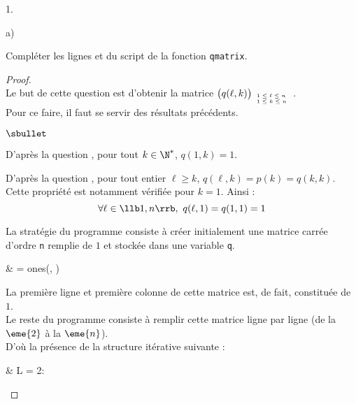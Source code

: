 \begin{noliste}{1.}
  \newpage


  \begin{noliste}{a)}
    \setlength{\itemsep}{2mm}
  \item Compléter les lignes  et  du script de la
    fonction {\tt qmatrix}.

    \begin{proof}~\\%
      Le but de cette question est d'obtenir la matrice $\big(q(\ell,
      k) \big)_{\tiny
        \begin{array}{l}
          1 \leq \ell \leq n \\
          1 \leq k \leq n 
        \end{array}
      }$.\\
      Pour ce faire, il faut se servir des résultats précédents.
      \begin{noliste}{$\sbullet$}
      \item D'après la question , pour tout $k \in
        \N^*$, $q(1, k) = 1$.%

      \item D'après la question , pour tout entier
        $\ell \geq k$, $q(\ell, k) = p(k) = q(k, k)$. Cette propriété
        est notamment vérifiée pour $k = 1$. Ainsi :
        \[
        \forall \ell \in \llb 1, n \rrb, \ q(\ell, 1) = q(1, 1) = 1
        \]

      \item La stratégie du programme consiste à créer initialement
        une matrice carrée d'ordre {\tt n} remplie de $1$ et stockée
        dans une variable {\tt q}.
        \begin{scilabC}{1}
          & \qquad {} = ones(, ) \nl %
        \end{scilabC}
        La première ligne et première colonne de cette matrice est, de
        fait, constituée de $1$.\\
        Le reste du programme consiste à remplir cette matrice ligne
        par ligne (de la $\eme{2}$ à la $\eme{n}$).\\
        D'où la présence de la structure itérative suivante :
        \begin{scilabC}{2}
          & \qquad {} L = 2: \nl %
        \end{scilabC} 
        

\end{noliste}
\end{proof}
\end{noliste}
\end{noliste}
